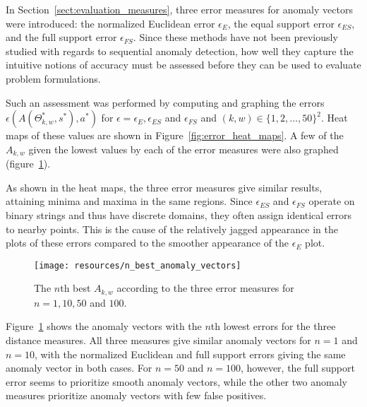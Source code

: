 In Section~\ref{sect:evaluation_measures}, three error measures for anomaly vectors were introduced: the normalized Euclidean error $\epsilon_E$, the equal support error $\epsilon_{ES}$, and the full support error $\epsilon_{FS}$. Since these methods have not been previously studied with regards to sequential anomaly detection, how well they capture the intuitive notions of accuracy must be assessed before they can be used to evaluate problem formulations.

Such an assessment was performed by computing and graphing the errors $\epsilon(A(\Theta_{k, w}^*, s^*), a^*)$ for $\epsilon = \epsilon_E, \epsilon_{ES}$ and $\epsilon_{FS}$ and $(k, w) \in {\{1,2,\dots,50\}}^2$. Heat maps of these values are shown in Figure~\ref{fig:error_heat_maps}. A few of the $A_{k, w}$ given the lowest values by each of the error measures were also graphed (figure~\ref{fig:n_best_anomaly_vectors}).

As shown in the heat maps, the three error measures give similar results, attaining minima and maxima in the same regions. Since $\epsilon_{ES}$ and $\epsilon_{FS}$ operate on binary strings and thus have discrete domains, they often assign identical errors to nearby points. This is the cause of the relatively jagged appearance in the plots of these errors compared to the smoother appearance of the $\epsilon_{E}$ plot.

\begin{figure}[ht]
    \vspace{-5pt}
    \begin{center}
        \texttt{[image: resources/n\_best\_anomaly\_vectors]}
    \end{center}
    \vspace{-20pt}
    \caption{\small{The $n$th best $A_{k, w}$ according to the three error measures for $n = 1, 10, 50$ and $100$.}}
\label{fig:n_best_anomaly_vectors}
    \vspace{-10pt}
\end{figure}

Figure~\ref{fig:n_best_anomaly_vectors} shows the anomaly vectors with the $n$th lowest errors for the three distance measures. All three measures give similar anomaly vectors for $n = 1$ and $n = 10$, with the normalized Euclidean and full support errors giving the same anomaly vector in both cases. For $n = 50$ and $n = 100$, however, the full support error seems to prioritize smooth anomaly vectors, while the other two anomaly measures prioritize anomaly vectors with few false positives.

